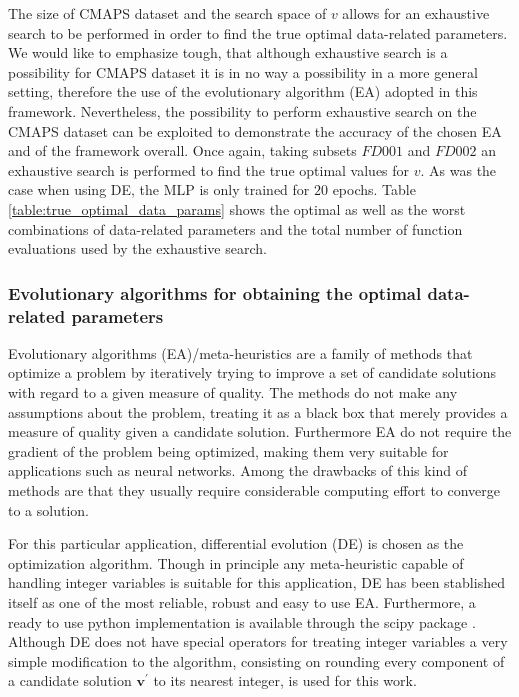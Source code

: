 \documentclass[12pt]{IEEEtran}%
\begin{document}
The size of CMAPS dataset and the search space of $v$ allows for an exhaustive
search to be performed in order to find the true optimal data-related
parameters. We would like to emphasize tough, that although exhaustive search
is a possibility for CMAPS dataset it is in no way a possibility in a more
general setting, therefore the use of the evolutionary algorithm (EA) adopted
in this framework. Nevertheless, the possibility to perform exhaustive search
on the CMAPS dataset can be exploited to demonstrate the accuracy of the
chosen EA and of the framework overall. Once again, taking subsets $FD001$ and
$FD002$ an exhaustive search is performed to find the true optimal values for
$v$. As was the case when using DE, the MLP is only trained for $20$ epochs.
Table \ref{table:true_optimal_data_params} shows the optimal as well as the
worst combinations of data-related parameters and the total number of function
evaluations used by the exhaustive search.


\subsubsection{Evolutionary algorithms for obtaining the optimal data-related
parameters}
\label{sec:ea_optimization_process}

Evolutionary algorithms (EA)/meta-heuristics are a family of methods that
optimize a problem by iteratively trying to improve a set of candidate
solutions with regard to a given measure of quality. The methods do not make
any assumptions about the problem, treating it as a black box that merely
provides a measure of quality given a candidate solution. Furthermore EA do
not require the gradient of the problem being optimized, making them very
suitable for applications such as neural networks. Among the drawbacks of this
kind of methods are that they usually require considerable computing effort to
converge to a solution.

For this particular application, differential evolution (DE) \cite{Storn1997}
is chosen as the optimization algorithm. Though in principle any
meta-heuristic capable of handling integer variables is suitable for this
application, DE has been stablished itself as one of the most reliable, robust
and easy to use EA. Furthermore, a ready to use python implementation is
available through the scipy package \cite{scipy}. Although DE does not have
special operators for treating integer variables a very simple modification to
the algorithm, consisting on rounding every component of a candidate solution
$\mathbf{v}^{\prime}$ to its nearest integer, is used for this work.
\end{document}
